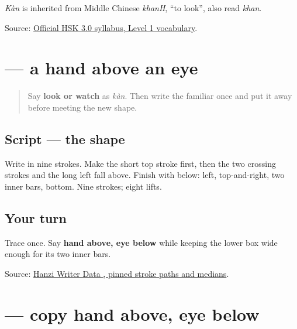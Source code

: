 \emph{Kàn} is inherited from Middle Chinese \emph{khanH}, \textquotedblleft{}to look\textquotedblright{}, also read \emph{khan}.

\begin{tcolorbox}[breakable,colback=teal!4,colframe=teal!35!black,title={Before you move on}]
Source: \href{https://hsk.cn-bj.ufileos.com/3.0/\%E6\%96\%B0\%E7\%89\%88HSK\%E8\%80\%83\%E8\%AF\%95\%E5\%A4\%A7\%E7\%BA\%B21219.pdf}{Official HSK 3.0 syllabus, Level 1 vocabulary}.
\end{tcolorbox}
\section[\texorpdfstring{\zh{看} (kàn)}{看 (kàn)}]{ — a hand above an eye}

\label{lesson:ZH-W18-kan-observe}



\begin{quote}
Say \textbf{look or watch} as \emph{kàn}. Then write the familiar \textbf{} once and put it away before meeting the new shape.
\end{quote}

\subsection*{Script — the shape}

Write \textbf{} in nine strokes. Make the short top stroke first, then the two crossing strokes and the long left fall above. Finish with \textbf{} below: left, top-and-right, two inner bars, bottom. Nine strokes; eight lifts.

\subsection*{Your turn}
Trace \textbf{} once. Say \textbf{hand above, eye below} while keeping the lower box wide enough for its two inner bars.

\begin{tcolorbox}[breakable,colback=teal!4,colframe=teal!35!black,title={Before you move on}]
Source: \href{https://raw.githubusercontent.com/chanind/hanzi-writer-data/68d10a4b21150cae5e1ebbd223eed289cf32d90c/data/\%E7\%9C\%8B.json}{Hanzi Writer Data , pinned stroke paths and medians}.
\end{tcolorbox}
\section[\texorpdfstring{\zh{看} (kàn)}{看 (kàn)}]{ — copy hand above, eye below}

